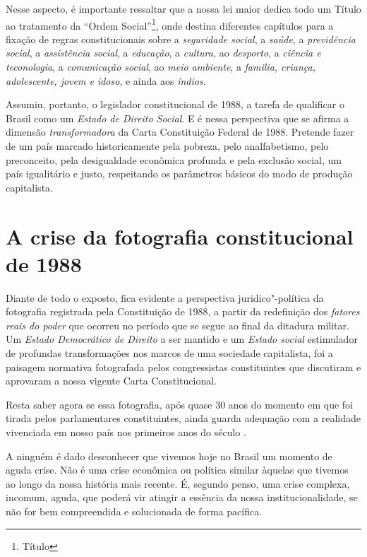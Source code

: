 Nesse aspecto, é importante ressaltar que a nossa lei maior dedica todo
um Título ao tratamento da ``Ordem Social''\footnote{Título },
onde destina diferentes capítulos para a fixação de regras
constitucionais sobre a \emph{seguridade social}, a \emph{saúde}, a
\emph{previdência social}, a \emph{assistência social}, a
\emph{educação}, a \emph{cultura,} ao \emph{desporto}, a \emph{ciência e
teconologia}, a \emph{comunicação social}, ao \emph{meio ambiente}, a
\emph{familia, criança, adolescente, jovem e idoso}, e ainda aos
\emph{índios}.

Assumiu, portanto, o legislador constitucional de 1988, a tarefa de
qualificar o Brasil como um \emph{Estado de Direito Social}. E é nessa
perspectiva que se afirma a dimensão \emph{transformadora} da Carta
Constituição Federal de 1988. Pretende fazer de um país marcado
historicamente pela pobreza, pelo analfabetismo, pelo preconceito, pela
desigualdade econômica profunda e pela exclusão social, um país
igualitário e justo, respeitando os parâmetros básicos do modo de
produção capitalista.

\section{A crise da fotografia constitucional de 1988}

Diante de todo o exposto, fica evidente a perspectiva juridico"-política
da fotografia registrada pela Constituição de 1988, a partir da
redefinição dos \emph{fatores reais do poder} que ocorreu no período que
se segue ao final da ditadura militar. Um \emph{Estado Democrático de
Direito} a ser mantido e um \emph{Estado social} estimulador de
profundas transformações nos marcos de uma sociedade capitalista, foi a
paisagem normativa fotografada pelos congressistas constituintes que
discutiram e aprovaram a nossa vigente Carta Constitucional.

Resta saber agora se essa fotografia, após quase 30 anos do momento em
que foi tirada pelos parlamentares constituintes, ainda guarda adequação
com a realidade vivenciada em nosso país nos primeiros anos do século
.

A ninguém é dado desconhecer que vivemos hoje no Brasil um momento de
aguda crise. Não é uma crise econômica ou política similar àquelas que
tivemos ao longo da nossa história mais recente. É, segundo penso, uma
crise complexa, incomum, aguda, que poderá vir atingir a essência da
nossa institucionalidade, se não for bem compreendida e solucionada de
forma pacífica.

